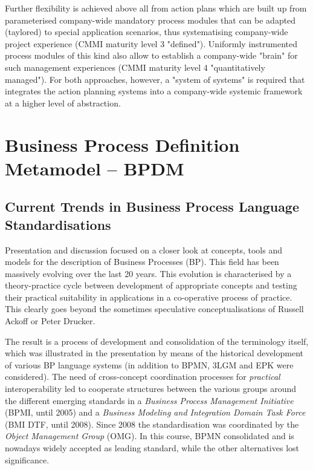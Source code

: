 \documentclass[11pt,a4paper]{article}
\begin{document}
Further flexibility is achieved above all from action plans which are built up
from parameterised company-wide mandatory process modules that can be adapted
(taylored) to special application scenarios, thus systematising company-wide
project experience (CMMI maturity level 3 "defined"). Uniformly instrumented
process modules of this kind also allow to establish a company-wide "brain"
for such management experiences (CMMI maturity level 4 "quantitatively
managed"). For both approaches, however, a "system of systems" is required
that integrates the action planning systems into a company-wide systemic
framework at a higher level of abstraction.

\section{Business Process Definition Metamodel – BPDM}

\subsection{Current Trends in Business Process Language Standardisations}

Presentation and discussion focused on a closer look at concepts, tools and
models for the description of Business Processes (BP). This field has been
massively evolving over the last 20 years.  This evolution is characterised by
a theory-practice cycle between development of appropriate concepts and
testing their practical suitability in applications in a co-operative process
of practice. This clearly goes beyond the sometimes speculative
conceptualisations of Russell Ackoff or Peter Drucker.

The result is a process of development and consolidation of the terminology
itself, which was illustrated in the presentation by means of the historical
development of various BP language systems (in addition to BPMN, 3LGM and EPK
were considered). The need of cross-concept coordination processes for
\emph{practical} interoperability led to cooperate structures between the
various groups around the different emerging standards in a \emph{Business
  Process Management Initiative} (BPMI, until 2005) and a \emph{Business
  Modeling and Integration Domain Task Force} (BMI DTF, until 2008). Since
2008 the standardisation was coordinated by the \emph{Object Management Group}
(OMG). In this course, BPMN consolidated and is nowadays widely accepted as
leading standard, while the other alternatives lost significance.
\end{document}
